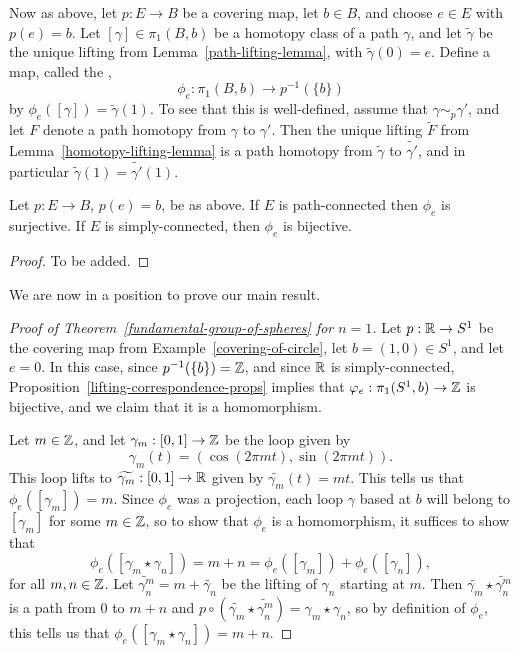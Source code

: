 Now as above, let $p : E \to B$ be a covering map, let $b \in B$, and choose $e \in E$ with $p(e) = b$. Let $[\gamma] \in \pi_1(B,b)$ be a homotopy class of a path $\gamma$, and let $\tilde{\gamma}$ be the unique lifting from Lemma~\ref{path-lifting-lemma}, with $\tilde{\gamma}(0) = e$. Define a map, called the ,
\[
  \phi_e : \pi_1(B,b) \to p^{-1}(\{b\})
\]
by $\phi_e([\gamma]) = \tilde{\gamma}(1)$. To see that this is well-defined, assume that $\gamma \sim_p \gamma'$, and let $F$ denote a path homotopy from $\gamma$ to $\gamma'$. Then the unique lifting $\tilde{F}$ from Lemma~\ref{homotopy-lifting-lemma} is a path homotopy from $\tilde{\gamma}$ to $\widetilde{\gamma'}$, and in particular $\tilde{\gamma}(1) = \widetilde{\gamma'}(1)$.

\begin{prop}
  \label{lifting-correspondence-props}
  Let $p : E \to B$, $p(e) = b$, be as above. If $E$ is path-connected then $\phi_e$ is surjective. If $E$ is simply-connected, then $\phi_e$ is bijective.
\end{prop}
\begin{proof}
  To be added.
\end{proof}

We are now in a position to prove our main result.
\begin{proof}[Proof of Theorem~\ref{fundamental-group-of-spheres} for $n = 1$]
  Let $p : \mathbb{R} \to S^1$ be the covering map from Example~\ref{covering-of-circle}, let $b = (1,0) \in S^1$, and let $e = 0$. In this case, since $p^{-1}(\{b\}) = \mathbb{Z}$, and since $\mathbb{R}$ is simply-connected, Proposition~\ref{lifting-correspondence-props} implies that $\varphi_e : \pi_1(S^1,b) \to \mathbb{Z}$ is bijective, and we claim that it is a homomorphism.
  
  Let $m \in \mathbb{Z}$, and let $\gamma_m : [0,1] \to \mathbb{Z}$ be the loop given by
  \[
    \gamma_m(t) = (\cos(2\pi mt), \sin(2\pi mt)).
  \]
  This loop lifts to $\widetilde{\gamma_m} : [0,1] \to \mathbb{R}$ given by $\widetilde{\gamma_m}(t) = mt$. This tells us that $\phi_e([\gamma_m]) = m$. Since $\phi_e$ was a projection, each loop $\gamma$ based at $b$ will belong to $[\gamma_m]$ for some $m \in \mathbb{Z}$, so to show that $\phi_e$ is a homomorphism, it suffices to show that
  \[
    \phi_e([\gamma_m \star \gamma_n]) = m + n = \phi_e([\gamma_m]) + \phi_e([\gamma_n]),
  \]
  for all $m , n \in \mathbb{Z}$. Let $\widetilde{\gamma_n^m} = m + \widetilde{\gamma_n}$ be the lifting of $\gamma_n$ starting at $m$. Then $\widetilde{\gamma_m} \star \widetilde{\gamma_n^m}$ is a path from $0$ to $m+n$ and $p \circ (\widetilde{\gamma_m} \star \widetilde{\gamma_n^m}) = \gamma_m \star \gamma_n$, so by definition of $\phi_e$, this tells us that $\phi_e([\gamma_m \star \gamma_n]) = m+n$.
\end{proof}

